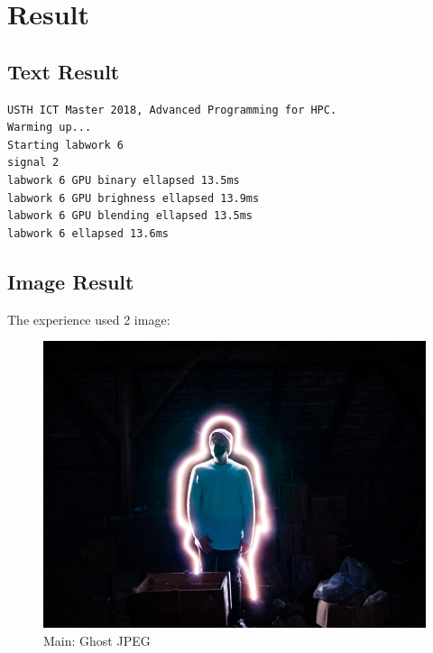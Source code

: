 \documentclass{article}
\begin{document}
\newpage

\section{Result}

\subsection{Text Result}
\begin{verbatim}
USTH ICT Master 2018, Advanced Programming for HPC.
Warming up...
Starting labwork 6
signal 2
labwork 6 GPU binary ellapsed 13.5ms
labwork 6 GPU brighness ellapsed 13.9ms
labwork 6 GPU blending ellapsed 13.5ms
labwork 6 ellapsed 13.6ms
\end{verbatim}

\subsection{Image Result}
The experience used 2 image:

\begin{figure}[h]
\includegraphics[width=\textwidth]{./labwork/data/ghost.jpeg}
\caption{Main: Ghost JPEG}
\end{figure}
\end{document}
